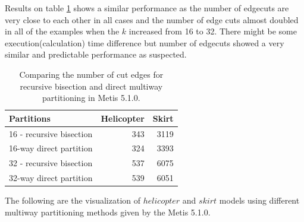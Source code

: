\documentclass[unicode,11pt,a4paper,oneside,numbers=endperiod,openany]{scrartcl}
\begin{document}
Results on table \ref{table:Compare_Metis} shows a similar performance as the number of edgecuts are very close to each other in all cases and the number of edge cuts almost doubled in all of the examples when the $k$ increased from 16 to 32. There might be some execution(calculation) time difference but number of edgecuts showed a very similar and predictable performance as suspected.

\begin{table}[h]
\caption{Comparing the number of cut edges for recursive bisection and direct multiway partitioning in Metis 5.1.0.}
\centering
\begin{tabular}{l|r|r} \hline\hline 
Partitions       &   Helicopter           & Skirt  \\ \hline
 16 - recursive bisection             &        343               &   3119  \\   
 16-way direct partition             &            324           &       3393      \\           
 32 - recursive bisection                &       537                &      6075       \\
 32-way direct partition              &            539           &       6051      \\  \hline \hline
\end{tabular}              
\label{table:Compare_Metis}
\end{table}
\vspace{20px}
The following are the visualization of ${helicopter}$ and ${skirt}$ models using different multiway partitioning methods given by the Metis 5.1.0. \\
\end{document}
